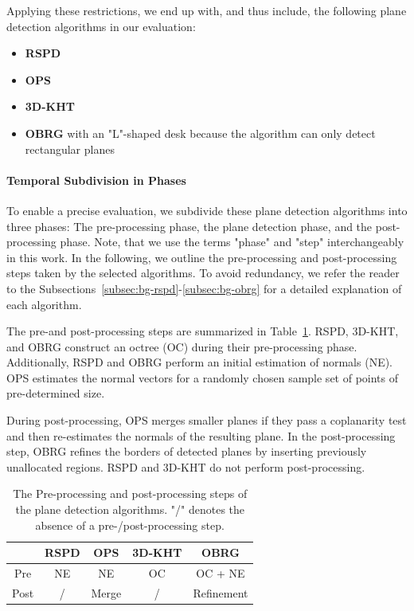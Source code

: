 \documentclass[main.tex]{subfiles}
\begin{document}
Applying these restrictions, we end up with, and thus include, the following plane detection algorithms in our evaluation:

\begin{itemize}
    \item \textbf{RSPD}
    \item \textbf{OPS}
    \item \textbf{3D-KHT}
    \item \textbf{OBRG}
          with an "L"-shaped desk because the algorithm can only detect rectangular planes
\end{itemize}

\paragraph{Temporal Subdivision in Phases}
\label{par:prepostalgos}
To enable a precise evaluation, we subdivide these plane detection algorithms into three phases:
The pre-processing phase, the plane detection phase, and the post-processing phase. Note, that
we use the terms "phase" and "step" interchangeably in this work. In the following, we outline
the pre-processing and post-processing steps taken by the selected algorithms. To avoid redundancy,
we refer the reader to the Subsections~\ref{subsec:bg-rspd}-\ref{subsec:bg-obrg} for a detailed explanation of each
algorithm.

The pre-and post-processing steps are summarized in Table~\ref{tab:pre-post}.
RSPD, 3D-KHT, and OBRG construct an octree (OC) during their pre-processing phase.
Additionally, RSPD and OBRG perform an initial estimation of normals (NE).
OPS estimates the normal vectors for a randomly chosen sample set of points of pre-determined size.

During post-processing, OPS merges smaller planes if they pass a coplanarity test and then re-estimates the normals of the
resulting plane. In the post-processing step, OBRG refines the borders of detected planes by inserting
previously unallocated regions. RSPD and 3D-KHT do not perform post-processing.


\begin{table}[H]
    \centering
    \begin{tabular}{c|cccc}
             & RSPD & OPS   & 3D-KHT & OBRG       \\ \hline
        Pre  & NE   & NE    & OC     & OC + NE    \\
        Post & /    & Merge & /      & Refinement
    \end{tabular}
    \caption{The Pre-processing and post-processing steps of the plane detection algorithms. "/" denotes the absence of
        a pre-/post-processing step.}
    \label{tab:pre-post}
\end{table}
\end{document}
